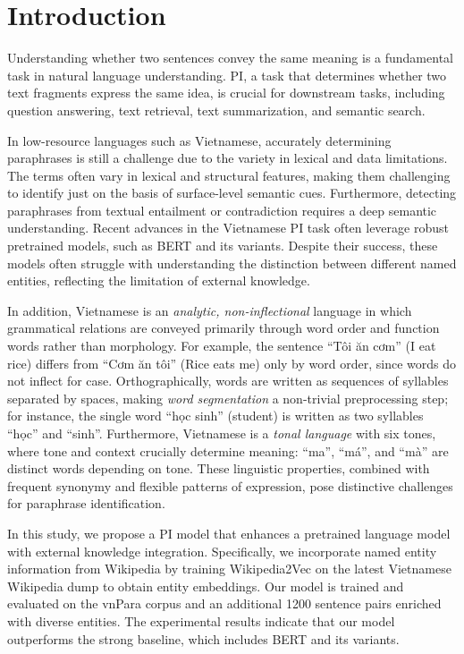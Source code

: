 \documentclass{llncs}
\begin{document}
\section{Introduction}
Understanding whether two sentences convey the same meaning is a fundamental task in natural language understanding. PI, a task that determines whether two text fragments express the same idea, is crucial for downstream tasks, including question answering, text retrieval, text summarization, and semantic search.

In low-resource languages such as Vietnamese, accurately determining paraphrases is still a challenge due to the variety in lexical and data limitations. The terms often vary in lexical and structural features, making them challenging to identify just on the basis of surface-level semantic cues. Furthermore, detecting paraphrases from textual entailment or contradiction requires a deep semantic understanding. Recent advances in the Vietnamese PI task \parencite{dinh2021, phan2022} often leverage robust pretrained models, such as BERT \parencite{devlin2019bert} and its variants. Despite their success, these models often struggle with understanding the distinction between different named entities, reflecting the limitation of external knowledge.

In addition, Vietnamese is an \textit{analytic, non-inflectional} language in which grammatical 
relations are conveyed primarily through word order and function words rather than morphology. 
For example, the sentence ``Tôi ăn cơm'' (I eat rice) differs from ``Cơm ăn tôi'' (Rice eats me) 
only by word order, since words do not inflect for case. Orthographically, words are written as 
sequences of syllables separated by spaces, making \textit{word segmentation} a non-trivial 
preprocessing step; for instance, the single word ``học sinh'' (student) is written as two syllables 
``học'' and ``sinh''. Furthermore, Vietnamese is a \textit{tonal language} with six tones, where tone 
and context crucially determine meaning: ``ma'', ``má'', and ``mà'' are distinct words depending on tone. 
These linguistic properties, combined with frequent synonymy and flexible patterns of expression, 
pose distinctive challenges for paraphrase identification.



In this study, we propose a PI model that enhances a pretrained language model with external knowledge integration. Specifically, we incorporate named entity information from Wikipedia by training Wikipedia2Vec \parencite{yamada2020wikipedia2vec} on the latest Vietnamese Wikipedia dump to obtain entity embeddings. Our model is trained and evaluated on the vnPara corpus and an additional 1200 sentence pairs enriched with diverse entities. The experimental results indicate that our model outperforms the strong baseline, which includes BERT and its variants.
\end{document}
